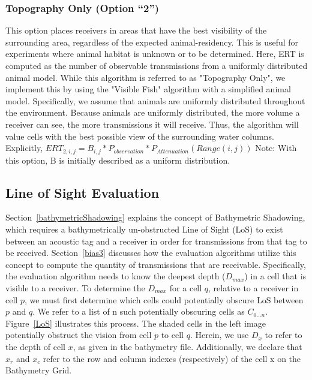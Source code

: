 \subsubsection{Topography Only (Option “2”)}
\label{bias2}
This option places receivers in areas that have the best visibility of the surrounding area, regardless of the expected animal-residency.  This is useful for experiments where animal habitat is unknown or to be determined.  Here, ERT is computed as the number of observable transmissions from a uniformly distributed animal model.  While this algorithm is referred to as "Topography Only", we implement this by using the "Visible Fish" algorithm with a simplified animal model.  Specifically, we assume that animals are uniformly distributed throughout the environment.  Because animals are uniformly distributed, the more volume a receiver can see, the more transmissions it will receive.  Thus, the algorithm will value cells with the best possible view of the surrounding water columns.\newline
Explicitly,
$ERT_{2,i,j} =  B_{i,j} * P_{observation} * P_{Attenuation}(Range(i,j))$\newline
Note: With this option, B is initially described as a uniform distribution.


\subsection {Line of Sight Evaluation}
\label{LoSAlgorithm}
Section~\ref{bathymetricShadowing} explains the concept of Bathymetric Shadowing, which requires a bathymetrically un-obstructed Line of Sight (LoS) to exist between an acoustic tag and a receiver in order for transmissions from that tag to be received.  Section~\ref{bias3} discusses how the evaluation algorithms utilize this concept to compute the quantity of transmissions that are receivable.  Specifically, the evaluation algorithm needs to know the deepest depth ($D_{max}$) in a cell that is visible to a receiver.  To determine the $D_{max}$ for a cell $q$, relative to a receiver in cell $p$, we must first determine which cells could potentially obscure LoS between $p$ and $q$.  We refer to a list of n such potentially obscuring cells as $C_{0...n}$.   Figure~\ref{LoS} illustrates this process.  The shaded cells in the left image potentially obstruct the vision from cell $p$ to cell $q$.  Herein, we use $D_x$ to refer to the depth of cell $x$, as given in the bathymetry file.  Additionally, we declare that $x_r$ and $x_c$ refer to the row and column indexes (respectively) of the cell x on the Bathymetry Grid.

